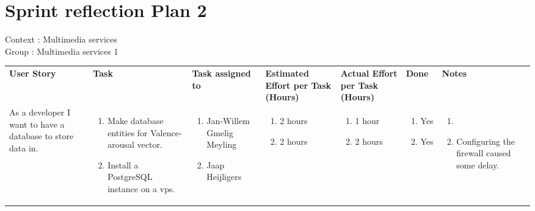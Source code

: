 \documentclass[11pt,a4paper,landscape]{article}
\begin{document}
\section*{Sprint reflection Plan 2}
Context : Multimedia services\\
Group : Multimedia services 1\\



\begin{table}[h]
\begin{tabular}{|p{3cm}|p{5.0cm}|p{3.0cm}|p{2.2cm}|p{2.2cm}|p{2.0cm}|p{5cm}}
\textbf{User Story} & \textbf{Task} & \textbf{Task assigned to} & \textbf{Estimated Effort per Task (Hours)} & \textbf{Actual Effort per Task (Hours)} & \textbf{Done} & \textbf{Notes}\\
As a developer I want to have a database to store data in.

&
\begin{enumerate}
\item Make database entities for Valence-arousal vector. 
\item Install a PostgreSQL instance on a vps.
\end{enumerate}

& 
\begin{enumerate}
\item Jan-Willem Gmelig Meyling
\item Jaap Heijligers
\end{enumerate}

& 
\begin{enumerate}
\item 2 hours
\item 2 hours
\end{enumerate}

&
\begin{enumerate}
\item 1 hour
\item 2 hours
\end{enumerate}

&
\begin{enumerate}
\item Yes
\item Yes
\end{enumerate}

&
\begin{enumerate}
\item 
\item Configuring the firewall caused some delay.
\end{enumerate}
\\


\end{tabular}
\end{table}
\end{document}
